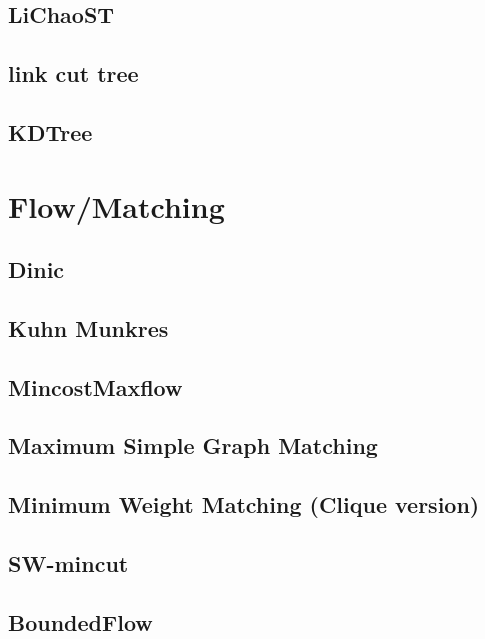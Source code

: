 \subsection{LiChaoST}

\subsection{link cut tree}

\subsection{KDTree}



\section{Flow/Matching}
\subsection{Dinic}

\subsection{Kuhn Munkres}

\subsection{MincostMaxflow}

\subsection{Maximum Simple Graph Matching}

\subsection{Minimum Weight Matching (Clique version)}

\subsection{SW-mincut}

\subsection{BoundedFlow}

